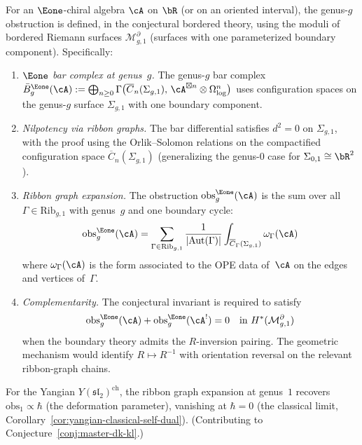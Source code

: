 \begin{conjecture}\label{conj:e1-genus-theory}
For an $\Eone$-chiral algebra $\cA$ on $\bR$
(or on an oriented interval), the genus-$g$ obstruction
is defined, in the conjectural bordered theory, using the moduli of
bordered Riemann surfaces $\mathcal{M}_{g,1}^{\partial}$
(surfaces with one parameterized boundary component).
Specifically:
\begin{enumerate}[label=\textup{(\roman*)}]
\item \emph{$\Eone$ bar complex at genus~$g$.}
The genus-$g$ bar complex
$\bar{B}_g^{\Eone}(\cA) :=
\bigoplus_{n \geq 0} \Gamma\bigl(
\overline{C}_n(\Sigma_{g,1}),\,
\cA^{\boxtimes n} \otimes
\Omega^n_{\log}\bigr)$
uses configuration spaces on the genus-$g$
surface $\Sigma_{g,1}$ with one boundary component.
\item \emph{Nilpotency via ribbon graphs.}
The bar differential satisfies $d^2 = 0$ on
$\Sigma_{g,1}$, with the proof using the
Orlik--Solomon relations on the
compactified configuration space
$\overline{C}_n(\Sigma_{g,1})$
(generalizing the genus-$0$ case for
$\Sigma_{0,1} \cong \bR^2$).
\item \emph{Ribbon graph expansion.}
The obstruction $\mathrm{obs}_g^{\Eone}(\cA)$
is the sum over all $\Gamma\in\mathrm{Rib}_{g,1}$ with genus~$g$
and one boundary cycle:
\[
\mathrm{obs}_g^{\Eone}(\cA) =
\sum_{\Gamma \in \mathrm{Rib}_{g,1}}
\frac{1}{|\mathrm{Aut}(\Gamma)|}
\int_{\overline{C}_\Gamma(\Sigma_{g,1})}
\omega_\Gamma(\cA)
\]
where $\omega_\Gamma(\cA)$ is the form
associated to the OPE data of~$\cA$ on the
edges and vertices of~$\Gamma$.
\item \emph{Complementarity.}
The conjectural invariant is required to satisfy
\[
\mathrm{obs}_g^{\Eone}(\cA) +
\mathrm{obs}_g^{\Eone}(\cA^!) = 0
\quad\text{in }H^*(\mathcal{M}_{g,1}^{\partial})
\]
when the boundary theory admits the $R$-inversion pairing.  The
geometric mechanism would identify $R\mapsto R^{-1}$ with orientation
reversal on the relevant ribbon-graph chains.
\end{enumerate}
For the Yangian $Y(\mathfrak{sl}_2)^{\mathrm{ch}}$,
the ribbon graph expansion at genus~$1$ recovers
$\mathrm{obs}_1 \propto \hbar$ (the deformation parameter),
vanishing at $\hbar = 0$ (the classical limit,
Corollary~\textup{\ref{cor:yangian-classical-self-dual}}).
\ifannalsedition\else
(Contributing to Conjecture~\ref{conj:master-dk-kl}.)
\fi
\end{conjecture}

